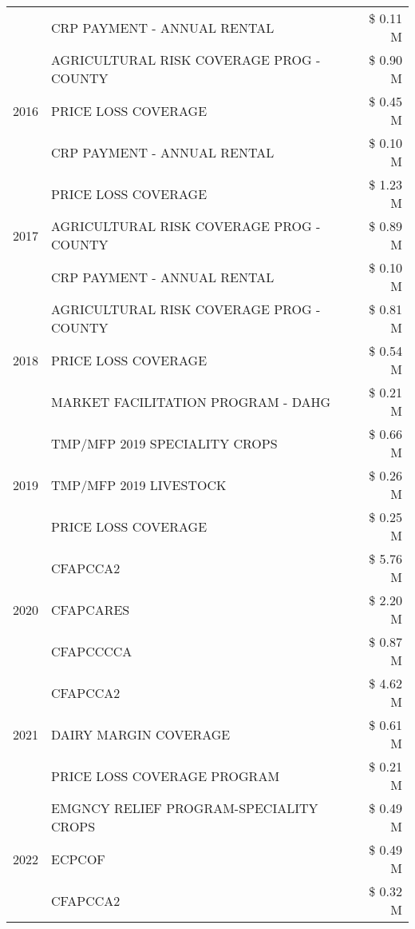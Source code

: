 \begin{tabular}{llr}
 & CRP PAYMENT - ANNUAL RENTAL & \$ 0.11 M \\
\cline{1-3}
\multirow[t]{3}{*}{2016} & AGRICULTURAL RISK COVERAGE PROG - COUNTY & \$ 0.90 M \\
 & PRICE LOSS COVERAGE & \$ 0.45 M \\
 & CRP PAYMENT - ANNUAL RENTAL & \$ 0.10 M \\
\cline{1-3}
\multirow[t]{3}{*}{2017} & PRICE LOSS COVERAGE & \$ 1.23 M \\
 & AGRICULTURAL RISK COVERAGE PROG - COUNTY & \$ 0.89 M \\
 & CRP PAYMENT - ANNUAL RENTAL & \$ 0.10 M \\
\cline{1-3}
\multirow[t]{3}{*}{2018} & AGRICULTURAL RISK COVERAGE PROG - COUNTY & \$ 0.81 M \\
 & PRICE LOSS COVERAGE & \$ 0.54 M \\
 & MARKET FACILITATION PROGRAM - DAHG & \$ 0.21 M \\
\cline{1-3}
\multirow[t]{3}{*}{2019} & TMP/MFP 2019 SPECIALITY CROPS & \$ 0.66 M \\
 & TMP/MFP 2019 LIVESTOCK & \$ 0.26 M \\
 & PRICE LOSS COVERAGE & \$ 0.25 M \\
\cline{1-3}
\multirow[t]{3}{*}{2020} & CFAPCCA2 & \$ 5.76 M \\
 & CFAPCARES & \$ 2.20 M \\
 & CFAPCCCCA & \$ 0.87 M \\
\cline{1-3}
\multirow[t]{3}{*}{2021} & CFAPCCA2 & \$ 4.62 M \\
 & DAIRY MARGIN COVERAGE & \$ 0.61 M \\
 & PRICE LOSS COVERAGE PROGRAM & \$ 0.21 M \\
\cline{1-3}
\multirow[t]{3}{*}{2022} & EMGNCY RELIEF PROGRAM-SPECIALITY CROPS & \$ 0.49 M \\
 & ECPCOF & \$ 0.49 M \\
 & CFAPCCA2 & \$ 0.32 M \\
\cline{1-3}
\bottomrule
\end{tabular}
